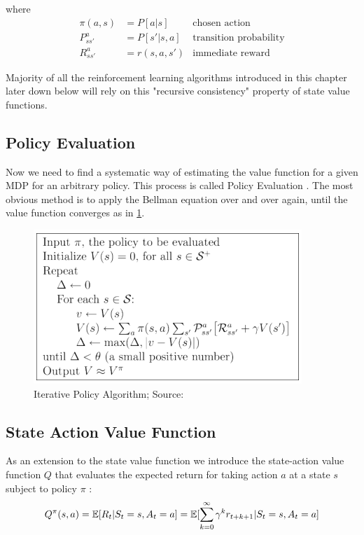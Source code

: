 where 
\begin{align*}
    \pi(a, s) &= P[a|s] &\text{chosen action}\\
    P^{a}_{ss'} &= P[s' | s, a] &\text{transition probability}\\
    R^{a}_{ss'} &= r(s, a, s') &\text{immediate reward}
\end{align*}

Majority of all the reinforcement learning algorithms introduced in this chapter later down below will rely on this "recursive consistency" \cite{lecture_mdp} property of state value functions. 
\subsection{Policy Evaluation}
Now we need to find a systematic way of estimating the value
function for a given MDP for an arbitrary policy. This process is called Policy Evaluation \cite{lecture_mdp}. The most obvious method is to apply the Bellman equation over and over again, until the value function converges as in \ref{fig:pia}.
\begin{figure}[H]
  \centering
  \includegraphics[scale=0.7]{figures/iterative_policy_evaluation.PNG}
  \caption{Iterative Policy Algorithm; Source: \cite{lecture_mdp}}
  \label{fig:pia}
\end{figure}
\subsection{State Action Value Function}
As an extension to the state value function we introduce the state-action value function $Q$ that evaluates the expected return for taking action $a$ at a state $s$ subject to policy $\pi$ \cite{lecture_mdp} :
\begin{align}
    Q^{\pi}(s, a) = \operatorname{\mathbb{E}}[R_t | S_t = s, A_t = a] = \operatorname{\mathbb{E}}[\sum^{\infty}_{k=0} \gamma^k r_{t+k+1} | S_t = s, A_t = a]
\end{align}

